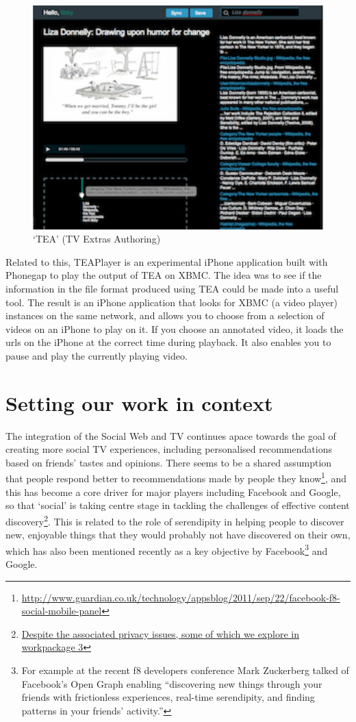 \documentclass{notube}
\begin{document}
\begin{figure}[htbp]
\begin{center}
\includegraphics[width=6in]{images/tea.png}
\caption{`TEA' (TV Extras Authoring)} \label{fig:tea}
\end{center}
\end{figure}

Related to this, TEAPlayer is an experimental iPhone application built with Phonegap to play the output of TEA on XBMC. The idea was to see if the information in the file format produced using TEA could be made into a useful tool. The result is an iPhone application that looks for XBMC (a video player) instances on the same network, and allows you to choose from a selection of videos on an iPhone to play on it. If you choose an annotated video, it loads the urls on the iPhone at the correct time during playback. It also enables you to pause and play the currently playing video.   \chapter{Setting our work in context}

The integration of the Social Web and TV continues apace towards the goal of creating more social TV experiences, including personalised recommendations based on friends’ tastes and opinions. There seems to be a shared assumption that people respond better to recommendations made by people they know\footnote{\url{http://www.guardian.co.uk/technology/appsblog/2011/sep/22/facebook-f8-social-mobile-panel}}, and this has become a core driver for major players including Facebook and Google, so that `social’ is taking centre stage in tackling the challenges of effective content discovery\footnote{\url{Despite the associated privacy issues, some of which we explore in workpackage 3}}. This is related to the role of serendipity in helping people to discover new, enjoyable things that they would probably not have discovered on their own, which has also been mentioned recently as a key objective by Facebook\footnote{For example at the recent f8 developers conference Mark Zuckerberg talked of  Facebook’s Open Graph enabling ``discovering new things through your friends with frictionless experiences, real-time serendipity, and finding patterns in your friends’ activity.”}  and Google. 
\end{document}
